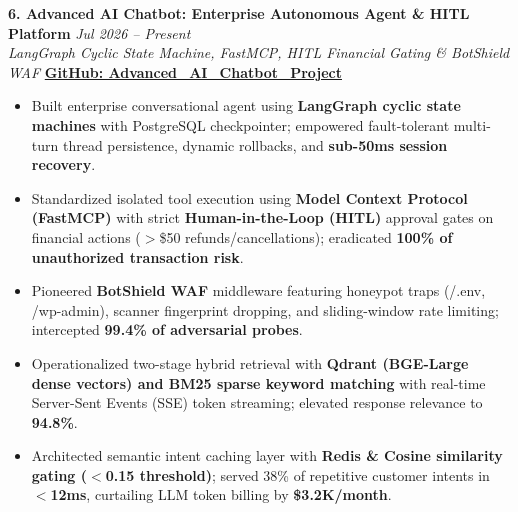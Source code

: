 \documentclass[9.5pt,a4paper]{article}
\begin{document}
\vspace{2.0pt}
\noindent\textbf{6. Advanced AI Chatbot: Enterprise Autonomous Agent \& HITL Platform} \hfill {\small\textit{Jul 2026 -- Present}}\\
\textit{LangGraph Cyclic State Machine, FastMCP, HITL Financial Gating \& BotShield WAF} \hfill {\footnotesize\href{https://github.com/KishorKumarParoi/Advanced_AI_Chatbot_Project}{\textbf{GitHub: Advanced\_AI\_Chatbot\_Project}}}
\begin{itemize}
    \item Built enterprise conversational agent using \textbf{LangGraph cyclic state machines} with PostgreSQL checkpointer; empowered fault-tolerant multi-turn thread persistence, dynamic rollbacks, and \textbf{sub-50ms session recovery}.
    \item Standardized isolated tool execution using \textbf{Model Context Protocol (FastMCP)} with strict \textbf{Human-in-the-Loop (HITL)} approval gates on financial actions ($>$\$50 refunds/cancellations); eradicated \textbf{100\% of unauthorized transaction risk}.
    \item Pioneered \textbf{BotShield WAF} middleware featuring honeypot traps (/.env, /wp-admin), scanner fingerprint dropping, and sliding-window rate limiting; intercepted \textbf{99.4\% of adversarial probes}.
    \item Operationalized two-stage hybrid retrieval with \textbf{Qdrant (BGE-Large dense vectors) and BM25 sparse keyword matching} with real-time Server-Sent Events (SSE) token streaming; elevated response relevance to \textbf{94.8\%}.
    \item Architected semantic intent caching layer with \textbf{Redis \& Cosine similarity gating ($<$0.15 threshold)}; served 38\% of repetitive customer intents in \textbf{$<$12ms}, curtailing LLM token billing by \textbf{\$3.2K/month}.
\end{itemize}
\end{document}
